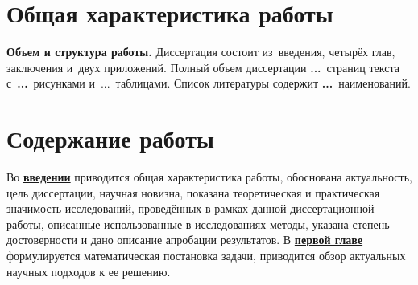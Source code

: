 \section*{Общая характеристика работы}

\newcommand{\actuality}{\textbf{\actualityTXT}}
\newcommand{\progress}{\textbf{\progressTXT}}
\newcommand{\actualityandprogress}{\textbf{\actualityandprogressTXT}}
\newcommand{\aim}{{\textbf\aimTXT}}
\newcommand{\tasks}{\textbf{\tasksTXT}}
\newcommand{\novelty}{\textbf{\noveltyTXT}}
\newcommand{\influence}{\textbf{\influenceTXT}}
\newcommand{\methods}{\textbf{\methodsTXT}}
\newcommand{\defpositions}{\textbf{\defpositionsTXT}}
\newcommand{\reliability}{\textbf{\reliabilityTXT}}
\newcommand{\probation}{\textbf{\probationTXT}}
\newcommand{\contribution}{\textbf{\contributionTXT}}
\newcommand{\publications}{\textbf{\publicationsTXT}}


\newcommand{\rom}[1]{%
  \textup{\uppercase\expandafter{\romannumeral#1}}%
}





\textbf{Объем и структура работы.} Диссертация состоит из~введения, четырёх глав, заключения и~двух приложений.
Полный объем диссертации \textbf{...}~страниц текста с~\textbf{...}~рисунками и~...~таблицами. Список литературы содержит \textbf{...}~наименований.

\section*{Содержание работы}
Во \underline{\textbf{введении}} приводится общая характеристика работы, 
обоснована актуальность, цель диссертации, научная новизна, показана теоретическая и практическая значимость исследований, проведённых в рамках данной диссертационной работы, описанные использованные в исследованиях методы, указана степень достоверности и дано описание апробации результатов.
\vspace{5mm}
В \underline{\textbf{первой главе}} формулируется математическая постановка задачи, приводится обзор актуальных научных подходов к ее решению.

